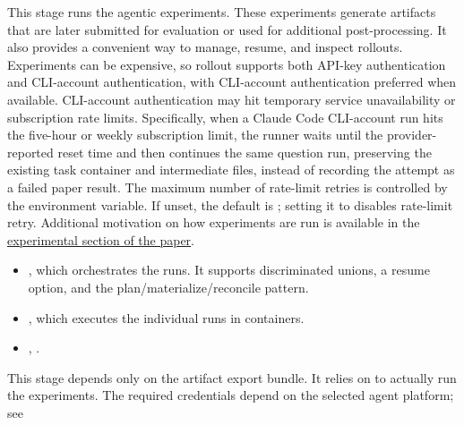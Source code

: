 \documentclass[11pt]{article}
\begin{document}
\label{docstart:agentic_rollout}

This stage runs the agentic experiments. 
These experiments generate artifacts that are later submitted for evaluation or used for additional post-processing. 
It also provides a convenient way to manage, resume, and inspect rollouts.
Experiments can be expensive, so rollout supports both API-key authentication and CLI-account authentication, with CLI-account authentication preferred when available.
CLI-account authentication may hit temporary service unavailability or subscription rate limits.
Specifically, when a Claude Code CLI-account run hits the five-hour or weekly subscription limit, the runner waits until the provider-reported reset time and then continues the same question run, preserving the existing task container and intermediate files, instead of recording the attempt as a failed paper result.
The maximum number of rate-limit retries is controlled by the  environment variable.
If unset, the default is ; setting it to  disables rate-limit retry.
Additional motivation on how experiments are run is available in the
\hyperref[sec:experimental-setup]{experimental section of the paper}.


\begin{itemize}
  \item {}, which orchestrates the runs. It supports discriminated unions, a resume option, and the plan/materialize/reconcile pattern.
  \item {}, which executes the individual runs in containers.
  \item {}, .
\end{itemize}

This stage depends only on the artifact  export bundle.
It relies on  to actually run the experiments.
The required credentials depend on the selected agent platform; see 
\end{document}
